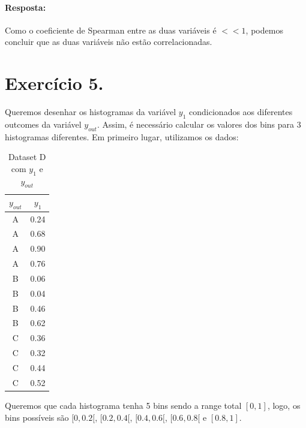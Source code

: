\documentclass{article}
\begin{document}
\paragraph{Resposta: }Como o coeficiente de Spearman entre as duas variáveis é $<< 1$, podemos concluir que as duas variáveis não estão correlacionadas.

\newpage

\section*{Exercício 5.}

Queremos desenhar os histogramas da variável $y_1$ condicionados aos diferentes outcomes da variável $y_{out}$. 
Assim, é necessário calcular os valores dos bins para 3 histogramas diferentes. Em primeiro lugar, utilizamos os dados:

\begin{table}[H]
  \centering
  \begin{tabular}{|c|c|}
    \hline
    $y_{out}$ & $y_1$ \\ \hline
    A         & 0.24  \\ \hline
    A         & 0.68  \\ \hline
    A         & 0.90  \\ \hline
    A         & 0.76  \\ \hline
    B         & 0.06  \\ \hline
    B         & 0.04  \\ \hline
    B         & 0.46  \\ \hline
    B         & 0.62  \\ \hline
    C         & 0.36  \\ \hline
    C         & 0.32  \\ \hline
    C         & 0.44  \\ \hline
    C         & 0.52  \\ \hline
  \end{tabular}
  \caption{Dataset D com $y_1$ e $y_{out}$}
  \label{tab:datasetD_y1_yout}
\end{table}

Queremos que cada histograma tenha 5 bins sendo a range total $[0,1]$, logo, os bins possíveis são $[0, 0.2[$, $[0.2, 0.4[$, $[0.4, 0.6[$, $[0.6, 0.8[$ e $[0.8, 1]$.
\end{document}
